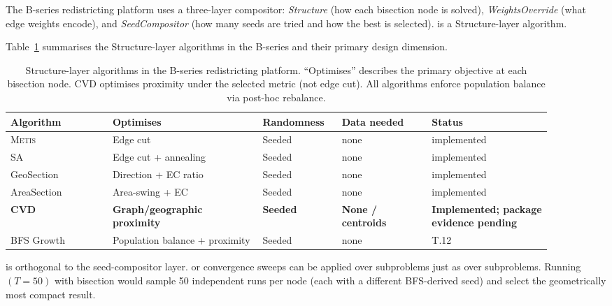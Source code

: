 The B-series redistricting platform uses a three-layer compositor:
\emph{Structure} (how each bisection node is solved),
\emph{WeightsOverride} (what edge weights encode), and
\emph{SeedCompositor} (how many seeds are tried and how the best is selected).
\cvd{} is a Structure-layer algorithm.

Table~\ref{tab:structure-comparison-bg} summarises the Structure-layer
algorithms in the B-series and their primary design dimension.

\begin{table}[t]
\centering
\caption{Structure-layer algorithms in the B-series redistricting platform.
  ``Optimises'' describes the primary objective at each bisection node.
  CVD optimises proximity under the selected metric (not edge cut).
  All algorithms enforce population balance via post-hoc rebalance.}
\label{tab:structure-comparison-bg}
\small
\setlength{\tabcolsep}{3pt}
\renewcommand{\arraystretch}{1.25}
\begin{tabular}{@{}p{0.17\linewidth}p{0.25\linewidth}p{0.13\linewidth}p{0.15\linewidth}p{0.20\linewidth}@{}}
\toprule
Algorithm & Optimises & Randomness & Data needed & Status \\
\midrule
\textsc{Metis} & Edge cut & Seeded & none & implemented \\
SA & Edge cut + annealing & Seeded & none & implemented \\
GeoSection & Direction + EC ratio & Seeded & none & implemented \\
AreaSection & Area-swing + EC & Seeded & none & implemented \\
\textbf{CVD} & \textbf{Graph/geographic proximity} & \textbf{Seeded}
                        & \textbf{None / centroids} & \textbf{Implemented; package evidence pending} \\
BFS Growth & Population balance + proximity & Seeded & none & T.12 \\
\bottomrule
\end{tabular}
\end{table}

\cvd{} is orthogonal to the seed-compositor layer.
\be{} or convergence sweeps can be applied over \cvd{} subproblems just as
over \metis{} subproblems.
Running \be{}$(T=50)$ with \cvd{} bisection would sample 50 independent
\cvd{} runs per node (each with a different BFS-derived seed) and select
the geometrically most compact result.
